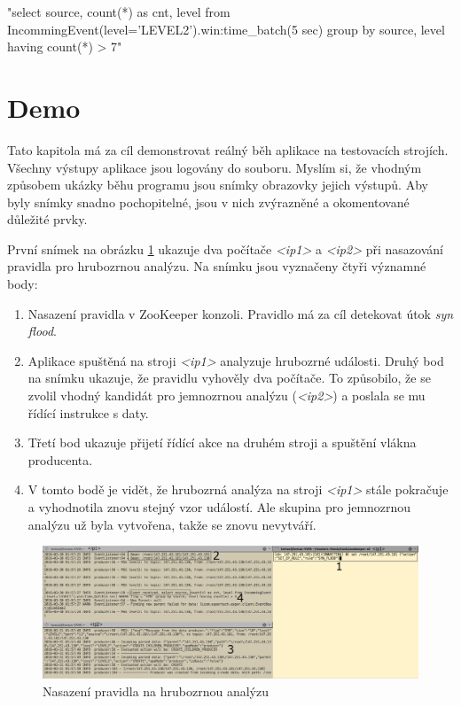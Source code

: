 \documentclass[
  digital, %
  table,   %
  nolof,     %
  nolot,     %
  oneside, %
  nocover,
  monochrome,
  12pt
]{fithesis3}
\begin{document}
\begin{center}
\begin{minipage}[H]{\linewidth}
	\begin{mylisting}
"select source, count(*) as cnt, level from
IncommingEvent(level='LEVEL2').win:time_batch(5 sec) group
by source, level having count(*) > 7"
	\end{mylisting}
	\label{fig:level_2_rule} 
\end{minipage}
\end{center}

\section{Demo}
Tato kapitola má za cíl demonstrovat reálný běh aplikace na testovacích strojích. Všechny výstupy aplikace jsou logovány do souboru. Myslím si, že vhodným způsobem ukázky běhu programu jsou snímky obrazovky jejich výstupů. Aby byly snímky snadno pochopitelné, jsou v nich zvýrazněné a okomentované důležité prvky.

První snímek na obrázku \ref{fig:deploy-rule-screen} ukazuje dva počítače \textit{<ip1>} a \textit{<ip2>} při nasazování pravidla pro hrubozrnou analýzu. Na snímku jsou vyznačeny čtyři významné body:

\begin{enumerate}
  \item Nasazení pravidla v ZooKeeper konzoli. Pravidlo má za cíl detekovat útok \textit{syn flood}.
  \item Aplikace spuštěná na stroji \textit{<ip1>} analyzuje hrubozrné události. Druhý bod na snímku ukazuje, že pravidlu vyhověly dva počítače. To způsobilo, že se zvolil vhodný kandidát pro jemnozrnou analýzu (\textit{<ip2>}) a poslala se mu řídící instrukce s daty.
  \item Třetí bod ukazuje přijetí řídící akce na druhém stroji a spuštění vlákna producenta. 
  \item V tomto bodě je vidět, že hrubozrná analýza na stroji \textit{<ip1>} stále pokračuje a vyhodnotila znovu stejný vzor událostí. Ale skupina pro jemnozrnou analýzu už byla vytvořena, takže se znovu nevytváří.
\end{enumerate}

\begin{figure}[H]
	\centering
    \includegraphics[width=\linewidth, height=.3\textheight]{images/deploy-rule-screen.png}
    \caption{Nasazení pravidla na hrubozrnou analýzu}
    \label{fig:deploy-rule-screen}
\end{figure}
\end{document}
